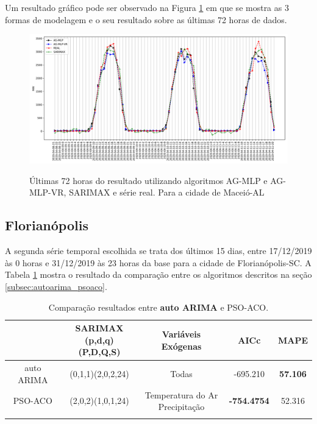 Um resultado gráfico pode ser observado na Figura \ref{fig:cap4_maceio_3_days_hibrids} em que se mostra as 3 formas de modelagem e o seu resultado sobre as últimas 72 horas de dados.

\begin{figure}[!htbp]
    \centering
    \caption{Últimas 72 horas do resultado utilizando algoritmos AG-MLP e AG-MLP-VR, SARIMAX e série real. Para a cidade de Maceió-AL}
    \includegraphics[width=\textwidth]{Figuras/results/comparison_hibrids_mc.png}
    \label{fig:cap4_maceio_3_days_hibrids}
\end{figure}

\subsection{Florianópolis}

A segunda série temporal escolhida se trata dos últimos 15 dias, entre 17/12/2019 às 0 horas e 31/12/2019 às 23 horas da base para a cidade de Florianópolis-SC. A Tabela \ref{tab:cap4_comp_flor_autoarima_psoaco} mostra o resultado da comparação entre os algoritmos descritos na seção \ref{subsec:autoarima_psoaco}.

\begin{table}[htbp]
\caption{Comparação resultados entre \textbf{auto ARIMA} e PSO-ACO.}
\begin{center}
\begin{tabular}{ccccc}
                    & \Longstack{SARIMAX \\ (p,d,q)(P,D,Q,S)} & Variáveis Exógenas & AICc & MAPE  \\\hline
auto ARIMA & (0,1,1)(2,0,2,24) & Todas & -695.210 & \textbf{57.106} \\\hline
PSO-ACO             & (2,0,2)(1,0,1,24) & \Longstack{Temperatura do Ar \\ Precipitação} & \textbf{-754.4754} & 52.316 \\\hline
\label{tab:cap4_comp_flor_autoarima_psoaco}
\end{tabular}
\end{center}
\end{table}

